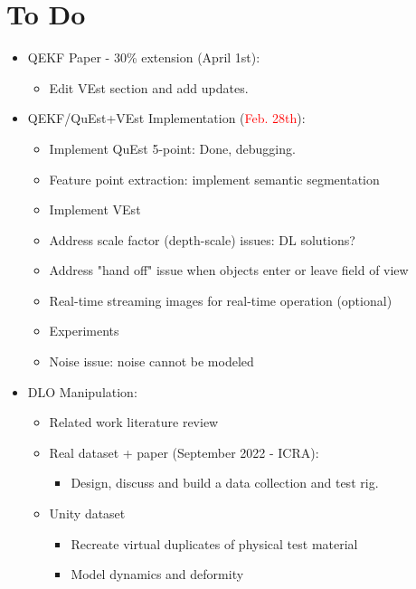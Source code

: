 \documentclass[11pt]{article}
\begin{document}
\section{To Do}
\begin{itemize}
  \item QEKF Paper - 30\% extension (April 1st):
  \begin{itemize}
      \item Edit VEst section and add updates.
  \end{itemize}
  \item QEKF/QuEst+VEst Implementation (\textcolor{red}{Feb. 28th}):
  \begin{itemize}
      \item Implement QuEst 5-point: Done, debugging.
      \item Feature point extraction: implement semantic segmentation
      \item Implement VEst
      \item Address scale factor (depth-scale) issues: DL solutions?
      \item Address "hand off" issue when objects enter or leave field of view
      \item Real-time streaming images for real-time operation (optional)
      \item Experiments
      \item Noise issue: noise cannot be modeled
  \end{itemize}
  \item  DLO Manipulation:
  \begin{itemize}
      \item Related work literature review
      \item Real dataset + paper (September 2022 - ICRA):
      \begin{itemize}
            \item Design, discuss and build a data collection and test rig.
      \end{itemize}
      \item Unity dataset
      \begin{itemize}
            \item Recreate virtual duplicates of physical test material
            \item Model dynamics and deformity
      \end{itemize}
  \end{itemize}
\end{itemize}
\end{document}
